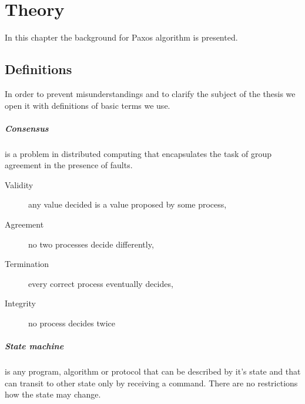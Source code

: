 \chapter{Theory}

%

In this chapter the background for Paxos algorithm is presented.



\section{Definitions}

In order to prevent misunderstandings and to clarify the subject of the thesis we open it with definitions of
basic %
terms we use.


\paragraph{Consensus}
is a problem in distributed computing that encapsulates the task of group agreement in the presence of faults.

\begin{description}
    \item[Validity] any value decided is a value proposed by some process,
    \item[Agreement] no two processes decide differently,
    \item[Termination] every correct process eventually decides,
    \item[Integrity] no process decides twice
\end{description}

\paragraph{State machine}
is any program, algorithm or protocol that can be described by it's state and that can transit to other state only by receiving a command.
There are no restrictions how the state may change.

